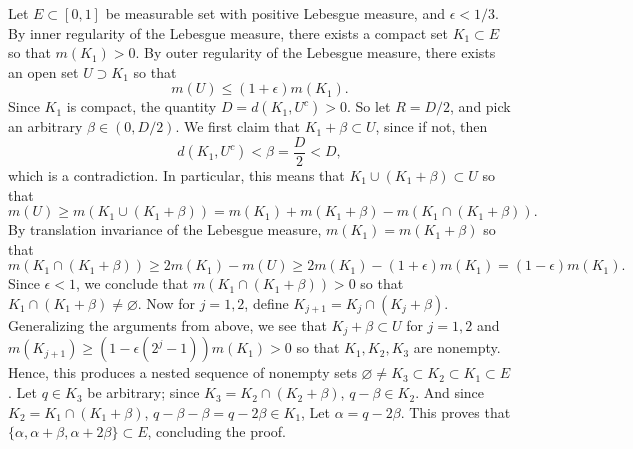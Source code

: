 \documentclass{article}
\begin{document}
\begin{solutions}
	Let $E \subset [0,1]$ be  measurable set with positive Lebesgue measure, and $\epsilon < 1/3$. By inner regularity of the Lebesgue measure, there exists a compact set $K_{1} \subset E$ so that $m(K_{1}) > 0$. By outer regularity of the Lebesgue measure, there exists an open set $U \supset K_{1}$ so that 
		\begin{equation}
			m(U) \leq (1 + \epsilon)m(K_{1}). 
		\end{equation}
	Since $K_{1}$ is compact, the quantity $D = d(K_{1}, U^{c}) > 0$. So let $R = D/2$, and pick an arbitrary $\beta \in (0, D/2)$. We first claim that $K_{1} + \beta \subset U$, since if not, then 
		\begin{equation}
			d(K_{1}, U^{c}) < \beta = \frac{D}{2} < D, 
		\end{equation}
	which is a contradiction. In particular, this means that $K_{1} \cup (K_{1} + \beta) \subset U$ so that 
		\begin{equation}
			m(U) \geq m(K_{1} \cup (K_{1} + \beta)) = m(K_{1}) + m(K_{1} + \beta) - m(K_{1} \cap (K_{1} + \beta)). 
		\end{equation}
	By translation invariance of the Lebesgue measure, $m(K_{1}) = m(K_{1} + \beta)$ so that 
		\begin{equation}
			m(K_{1} \cap (K_{1} + \beta)) \geq 2m(K_{1}) - m(U) \geq 2m(K_{1}) - (1 + \epsilon)m(K_{1}) = (1 - \epsilon)m(K_{1}). 
		\end{equation}
	Since $\epsilon < 1$, we conclude that $m(K_{1} \cap (K_{1} + \beta)) > 0$ so that $K_{1} \cap (K_{1} + \beta) \neq \varnothing$. Now for $j = 1, 2$, define $K_{j + 1} = K_{j} \cap (K_{j} + \beta)$. Generalizing the arguments from above, we see that $K_{j} + \beta \subset U$ for $j = 1, 2$ and $m(K_{j + 1}) \geq (1 -\epsilon(2^{j} - 1))m(K_{1}) > 0$ so that $K_{1}, K_{2}, K_{3}$ are nonempty. Hence, this produces a nested sequence of nonempty sets $\varnothing \neq K_{3} \subset K_{2} \subset K_{1} \subset E$. Let $q \in K_{3}$ be arbitrary; since $K_{3} = K_{2} \cap (K_{2} + \beta)$, $q - \beta \in K_{2}$. And since $K_{2} = K_{1} \cap (K_{1} + \beta)$, $q - \beta -\beta = q -2\beta \in K_{1}$, Let $\alpha = q - 2\beta$. This proves that $\{\alpha, \alpha + \beta, \alpha + 2\beta\} \subset E$, concluding the proof. 
\end{solutions}


\newpage 
\end{document}
